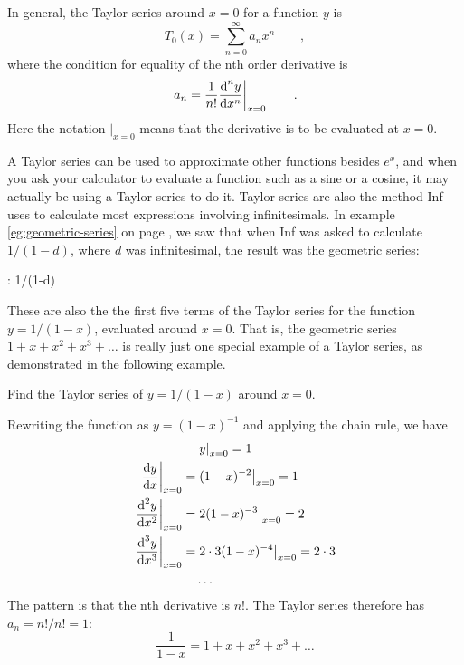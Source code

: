 In general, the Taylor series
around $x=0$ for a function $y$ is
\begin{equation*}
  T_0(x) = \sum_{n=0}^\infty a_n x^n \qquad ,
\end{equation*}
where the condition for equality of the nth order derivative is
\begin{equation*}
  \left. a_n = \frac{1}{n!}\frac{\textup{d}^n y}{\textup{d} x^n}\right|_{x=0} \qquad .
\end{equation*}
Here the notation $\left.\right|_{x=0}$ means that the derivative is to be evaluated at $x=0$.

A Taylor series can be used to approximate other functions besides $e^x$, and when you ask your calculator to evaluate a
function such as a sine or a cosine, it may actually be using a Taylor series to do it.
Taylor series are also the method Inf uses to calculate most expressions involving infinitesimals. In example
\ref{eg:geometric-series} on page \pageref{eg:geometric-series}, we saw that
when Inf was asked to calculate $1/(1-d)$, where $d$ was infinitesimal, the result was the geometric series:
\begin{Code}
  \ii : 1/(1-d)
\end{Code}
These are also the the first five terms of the Taylor series for the function $y=1/(1-x)$, evaluated around $x=0$.
That is, the geometric series $1+x+x^2+x^3+\ldots$ is really just one special example of a Taylor series, as
demonstrated in the following example.

\begin{eg}\label{eg:taylor-geometric}
\egquestion Find the Taylor series of $y=1/(1-x)$ around $x=0$.

\eganswer Rewriting the function as $y=(1-x)^{-1}$ and applying the chain rule, we have
\begin{align*}
                                                & \left.y\right|_{x=0} = 1\\
  \left.\frac{\textup{d} y}{\textup{d} x}\right|_{x=0}     =& \left.(1-x)^{-2}\right|_{x=0} = 1\\
  \left.\frac{\textup{d}^2 y}{\textup{d} x^2}\right|_{x=0} =& \left.2(1-x)^{-3}\right|_{x=0} = 2\\
  \left.\frac{\textup{d}^3 y}{\textup{d} x^3}\right|_{x=0} =& \left.2\cdot3(1-x)^{-4}\right|_{x=0} = 2\cdot3\\
                                                & \ldots
\end{align*}
The pattern is that the nth derivative is $n!$. The Taylor series therefore has $a_n=n!/n!=1$:
\begin{equation*}
  \frac{1}{1-x} =  1+x+x^2+x^3+\ldots
\end{equation*}
\end{eg}

